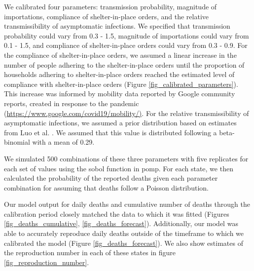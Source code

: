 \documentclass[11pt]{article}
\begin{document}
We calibrated four parameters: transmission probability, magnitude of importations, compliance of shelter-in-place orders, and the relative transmissibility of asymptomatic infections. We specified that transmission probability could vary from 0.3 - 1.5, magnitude of importations could vary from 0.1 - 1.5, and compliance of shelter-in-place orders could vary from 0.3 - 0.9. For the compliance of shelter-in-place orders, we assumed a linear increase in the number of people adhering to the shelter-in-place orders until the proportion of households adhering to shelter-in-place orders reached the estimated level of compliance with shelter-in-place orders (Figure \ref{fig_calibrated_parameters}). This increase was informed by mobility data reported by Google community reports, created in response to the pandemic (\url{https://www.google.com/covid19/mobility/)}. For the relative transmissibility of asymptomatic infections, we assumed a prior distribution based on estimates from Luo et al. \cite{Luo2020_Contact_MedRxiv}. We assumed that this value is distributed following a beta-binomial with a mean of 0.29.

We simulated 500 combinations of these three parameters with five replicates for each set of values using the sobol function in pomp. For each state, we then calculated the probability of the reported deaths given each parameter combination for assuming that deaths follow a Poisson distribution. 

Our model output for daily deaths and cumulative number of deaths through the calibration period closely matched the data to which it was fitted (Figures \ref{fig_deaths_cumulative}, \ref{fig_deaths_forecast}). Additionally, our model was able to accurately reproduce daily deaths outside of the timeframe to which we calibrated the model (Figure \ref{fig_deaths_forecast}). We also show estimates of the reproduction number in each of these states in figure \ref{fig_reproduction_number}. 
\end{document}
